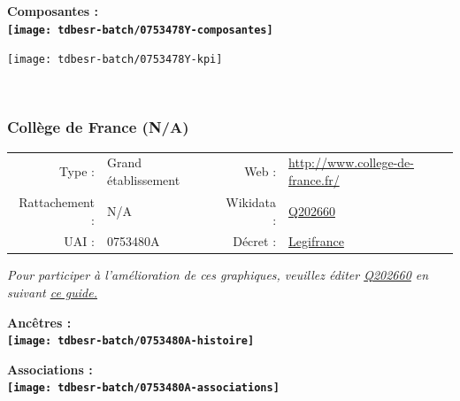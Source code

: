 \documentclass[12pt,french,]{article}
\begin{document}
\begin{center} \bf Composantes : \\  
\texttt{[image: tdbesr-batch/0753478Y-composantes]} \end{center}

\begin{center}\texttt{[image: tdbesr-batch/0753478Y-kpi]} \end{center}\checkoddpage

\ifoddpage ~\newpage \fi   

\hypertarget{colluxe8ge-de-france-na}{%
\subsubsection{Collège de France (N/A)}\label{colluxe8ge-de-france-na}}

\begin{tabular*}{\textwidth}{rp{5cm}rl}  
\hline  
Type : & Grand établissement & Web : &\href{http://www.college-de-france.fr/}{http://www.college-de-france.fr/} \\  
Rattachement : & N/A & Wikidata : & \href{https://www.wikidata.org/entity/Q202660}{Q202660} \\  
UAI : & 0753480A & Décret : & \href{http://www.legifrance.gouv.fr/affichTexte.do?dateTexte=&categorieLien=id&cidTexte=JORFTEXT000000350825&fastPos=2&fastReqId=1763095596&oldAction=rechExpTexteJorf}{Legifrance} \\  
\hline  
\end{tabular*}

\textit{\scriptsize Pour participer à l'amélioration de ces graphiques, veuillez éditer  \href{https://www.wikidata.org/entity/Q202660}{Q202660}  en suivant \href{https://github.com/cpesr/wikidataESR/blob/master/Rmd/wikidataESR.md}{ce guide.}}

\vspace{1cm}  
\begin{minipage}[b]{0.50\textwidth}\begin{center} \bf Ancêtres : \\  
\texttt{[image: tdbesr-batch/0753480A-histoire]} \end{center}\end{minipage}\begin{minipage}[b]{0.50\textwidth}\begin{center} \bf Associations : \\  
\texttt{[image: tdbesr-batch/0753480A-associations]} \end{center}\end{minipage}
\end{document}
